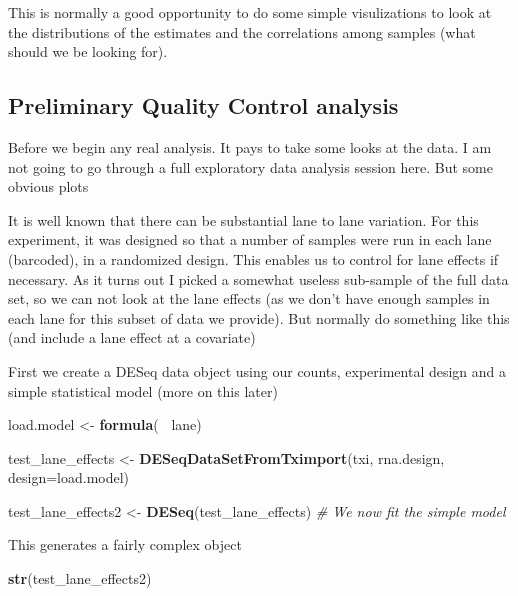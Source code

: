 \documentclass[
]{article}
\newenvironment{Shaded}{\begin{snugshade}}{\end{snugshade}}
\newcommand{\CommentTok}[1]{\textcolor[rgb]{0.56,0.35,0.01}{\textit{#1}}}
\newcommand{\DataTypeTok}[1]{\textcolor[rgb]{0.13,0.29,0.53}{#1}}
\newcommand{\KeywordTok}[1]{\textcolor[rgb]{0.13,0.29,0.53}{\textbf{#1}}}
\newcommand{\NormalTok}[1]{#1}
\newcommand{\OperatorTok}[1]{\textcolor[rgb]{0.81,0.36,0.00}{\textbf{#1}}}
\newcommand{\StringTok}[1]{\textcolor[rgb]{0.31,0.60,0.02}{#1}}
\begin{document}
This is normally a good opportunity to do some simple visulizations to
look at the distributions of the estimates and the correlations among
samples (what should we be looking for).

\hypertarget{preliminary-quality-control-analysis}{%
\subsection{Preliminary Quality Control
analysis}\label{preliminary-quality-control-analysis}}

Before we begin any real analysis. It pays to take some looks at the
data. I am not going to go through a full exploratory data analysis
session here. But some obvious plots

It is well known that there can be substantial lane to lane variation.
For this experiment, it was designed so that a number of samples were
run in each lane (barcoded), in a randomized design. This enables us to
control for lane effects if necessary. As it turns out I picked a
somewhat useless sub-sample of the full data set, so we can not look at
the lane effects (as we don't have enough samples in each lane for this
subset of data we provide). But normally do something like this (and
include a lane effect at a covariate)

First we create a DESeq data object using our counts, experimental
design and a simple statistical model (more on this later)

\begin{Shaded}
\begin{Highlighting}[]
\NormalTok{load.model <-}\StringTok{ }\KeywordTok{formula}\NormalTok{(}\OperatorTok{~}\StringTok{ }\NormalTok{lane)}

\NormalTok{test_lane_effects <-}\StringTok{ }\KeywordTok{DESeqDataSetFromTximport}\NormalTok{(txi,}
\NormalTok{  rna.design, }\DataTypeTok{design=}\NormalTok{load.model)}

\NormalTok{test_lane_effects2 <-}\StringTok{ }\KeywordTok{DESeq}\NormalTok{(test_lane_effects)}
\CommentTok{# We now fit the simple model}
\end{Highlighting}
\end{Shaded}

This generates a fairly complex object

\begin{Shaded}
\begin{Highlighting}[]
\KeywordTok{str}\NormalTok{(test_lane_effects2)}
\end{Highlighting}
\end{Shaded}
\end{document}
